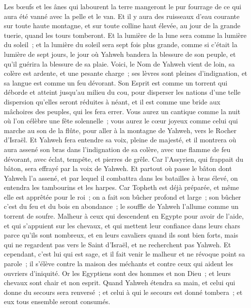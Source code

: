 \begin{multicols}{2}
Les bœufs et les ânes qui labourent la terre mangeront le pur fourrage de ce qui aura été vanné avec la pelle et le van.
Et il y aura des ruisseaux d'eau courante sur toute haute montagne, et sur toute colline haut élevée, au jour de la grande tuerie, quand les tours tomberont.
Et la lumière de la lune sera comme la lumière du soleil~; et la lumière du soleil sera sept fois plus grande, comme si c'était la lumière de sept jours, le jour où Yahweh bandera la blessure de son peuple, et qu'il guérira la blessure de sa plaie.
Voici, le Nom de Yahweh vient de loin, sa colère est ardente, et une pesante charge~; ses lèvres sont pleines d'indignation, et sa langue est comme un feu dévorant.
Son Esprit est comme un torrent qui déborde et atteint jusqu'au milieu du cou, pour disperser les nations d'une telle dispersion qu'elles seront réduites à néant, et il est comme une bride aux mâchoires des peuples, qui les fera errer.
Vous aurez un cantique comme la nuit où l'on célèbre une fête solennelle~; vous aurez le cœur joyeux comme celui qui marche au son de la flûte, pour aller à la montagne de Yahweh, vers le Rocher d'Israël.
Et Yahweh fera entendre sa voix, pleine de majesté, et il montrera où aura assené son bras dans l'indignation de sa colère, avec une flamme de feu dévorant, avec éclat, tempête, et pierres de grêle.
Car l'Assyrien, qui frappait du bâton, sera effrayé par la voix de Yahweh.
Et partout où passe le bâton dont Yahweh l'a assené, et par lequel il combattra dans les batailles à bras élevé, on entendra les tambourins et les harpes.
Car Topheth est déjà préparée, et même elle est apprêtée pour le roi~; on a fait son bûcher profond et large~; son bûcher c'est du feu et du bois en abondance~; le souffle de Yahweh l'allume comme un torrent de soufre.
\VerseOne{}Malheur à ceux qui descendent en Egypte pour avoir de l'aide, et qui s'appuient sur les chevaux, et qui mettent leur confiance dans leurs chars parce qu'ils sont nombreux, et en leurs cavaliers quand ils sont bien forts, mais qui ne regardent pas vers le Saint d'Israël, et ne recherchent pas Yahweh.
Et cependant, c'est lui qui est sage, et il fait venir le malheur et ne révoque point sa parole~; il s'élève contre la maison des méchants et contre ceux qui aident les ouvriers d'iniquité.
Or les Egyptiens sont des hommes et non Dieu~; et leurs chevaux sont chair et non esprit. Quand Yahweh étendra sa main, et celui qui donne du secours sera renversé~; et celui à qui le secours est donné tombera~; et eux tous ensemble seront consumés.

\end{multicols}
